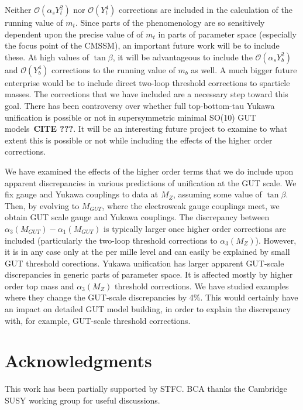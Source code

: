 \documentclass[final,3p,times,pdflatex]{elsarticle}
\begin{document}
 Neither $\mathcal O(\alpha_s Y_t^2) $ nor $\mathcal O(Y_t^4)$
 corrections are included in the calculation of the running value of
 $m_t$. Since parts of the phenomenology are so 
 sensitively dependent upon the precise value of of $m_t$ in parts of
 parameter space (especially the focus point of the CMSSM), an important
 future work will be to include these. At high values of $\tan \beta$, it will
 be advantageous to include the $\mathcal O(\alpha_s Y_b^2) $ and $\mathcal
 O(Y_b^4)$ corrections to the running value of 
 $m_b$ as well. 
 A much bigger future enterprise would
 be to  include direct two-loop threshold corrections to sparticle masses. The
 corrections that we have included are a necessary step toward this goal. 
 There has been controversy over whether full top-bottom-tau Yukawa
 unification is possible or not in supersymmetric minimal SO(10) GUT
 models~{\bf CITE ???}. 
 It will be an interesting future project to examine to what extent this is
 possible or not while including the effects of the higher order corrections. 

 We have examined the effects of the higher order terms that we do include
 upon apparent discrepancies in various predictions of unification at the GUT
 scale. We fix gauge and Yukawa couplings to data at $M_Z$, assuming some
 value of $\tan \beta$. Then, by evolving to $M_{GUT}$, where the electroweak
 gauge couplings meet, we obtain GUT scale gauge and Yukawa couplings. The
 discrepancy between $\alpha_3(M_{GUT})-\alpha_1(M_{GUT})$ is typically larger 
 once higher order corrections are included (particularly the two-loop
 threshold corrections to $\alpha_3(M_Z)$). However, it is in any case only at
 the per mille level and can easily be explained by small GUT threshold
 corections. Yukawa unification has larger apparent GUT-scale discrepancies in
 generic parts of parameter space. It is affected mostly by higher order top
 mass and $\alpha_3(M_Z)$ threshold corrections. We have studied examples
 where they change the GUT-scale
 discrepancies by 4$\%$. This would certainly have an impact on detailed GUT
 model building, in order to explain the discrepancy with, for example,
 GUT-scale  threshold corrections. 
 

\section*{Acknowledgments}
This work has been partially supported by STFC. BCA thanks the Cambridge SUSY
working group for useful discussions.
\end{document}
